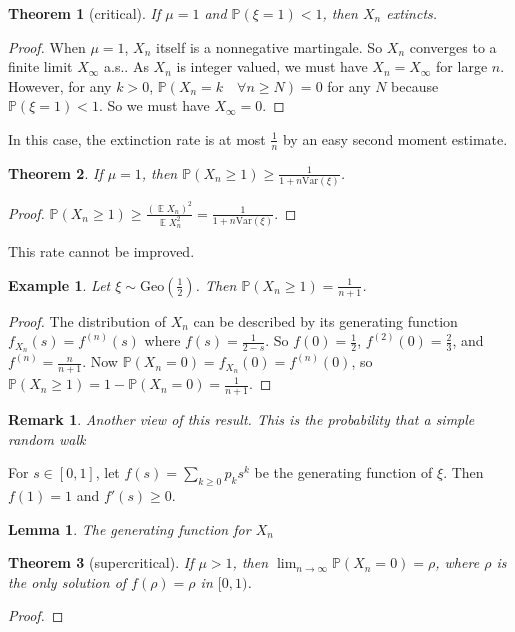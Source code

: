 \documentclass{article}
\newtheorem{Thm}{Theorem}[section]
\newtheorem{Lem}{Lemma}[section]
\newtheorem{Eg}{Example}[section]
\newtheorem*{Rk}{Remark}
\theoremstyle{definition}
\newcommand{\EE}{\operatorname{\mathbb{E}}}
\newcommand{\PP}{\mathbb{P}}
\renewcommand{\geq}{\geqslant}
\newcommand{\<}{\left\langle}
\renewcommand{\>}{\right\rangle}
\newcommand{\var}{\text{Var}}
\begin{document}
\begin{Thm}[critical]
    If $\mu=1$ and $\PP(\xi=1)<1$, then $X_n$ extincts.
\end{Thm}
\begin{proof}
    When $\mu=1$, $X_n$ itself is a nonnegative martingale. So $X_n$ converges to a finite limit $X_\infty$ a.s..
    As $X_n$ is integer valued, we must have $X_n= X_\infty$ for large $n$. 
    However, for any $k>0$, $\PP(X_n=k\quad \forall n\geq N)=0$ for any $N$ because $\PP(\xi=1)<1$. So we must have $X_\infty=0$.
\end{proof}
In this case, the extinction rate is at most $\frac{1}{n}$ by an easy second moment estimate.
\begin{Thm}
    If $\mu=1$, then $\PP(X_n \geq 1)\geq\frac{1}{1+n\var(\xi)}$.
\end{Thm}
\begin{proof}
    $\PP(X_n \geq 1)\geq\frac{(\EE X_n)^2}{\EE X_n^2}=\frac{1}{1+n\var(\xi)}$.
\end{proof}
This rate cannot be improved.
\begin{Eg}
    Let $\xi\sim\text{Geo}(\frac{1}{2})$. Then $\PP(X_n \geq 1)=\frac{1}{n+1}$.
\end{Eg}
\begin{proof}
    The distribution of $X_n$ can be described by its generating function $f_{X_n}(s)=f^{(n)}(s)$
    where $f(s)=\frac{1}{2-s}$. So $f(0)=\frac{1}{2}$, $f^{(2)}(0)=\frac{2}{3}$, and $f^{(n)}=\frac{n}{n+1}$.
    Now $\PP(X_n=0)=f_{X_n}(0)=f^{(n)}(0)$, so $\PP(X_n \geq 1)=1-\PP(X_n = 0)=\frac{1}{n+1}$.
\end{proof}
\begin{Rk}
    Another view of this result.
    This is the probability that a simple random walk 
\end{Rk}
For $s\in [0,1]$, let $f(s)=\sum_{k\geq 0}p_ks^k$ be the generating function of $\xi$.
Then $f(1)=1$ and $f'(s)\geq 0$.
\begin{Lem}
    The generating function for $X_n$
\end{Lem}


\begin{Thm}[supercritical]
    If $\mu>1$, then $\lim_{n\to\infty}\PP(X_n=0)=\rho$, where $\rho$ is the only solution of $f(\rho)=\rho$ in $[0,1)$.
\end{Thm}
\begin{proof}
    
\end{proof}
\end{document}
